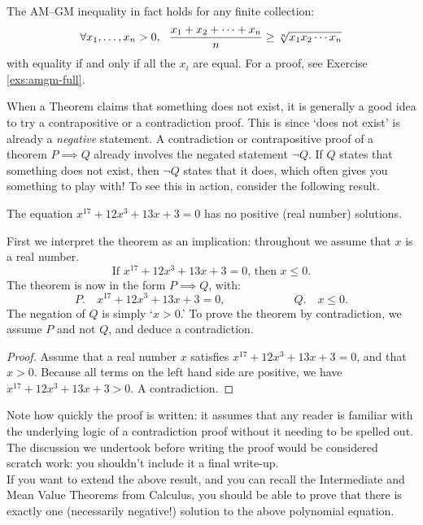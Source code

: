 The AM--GM inequality in fact holds for any finite collection:
\[\forall \lst xn>0,\ \ \frac{x_1+x_2+\cdots+x_n}n\ge\sqrt[n]{x_1x_2\cdots x_n}\]
with equality if and only if all the $x_i$ are equal. For a proof, see Exercise \ref{exs:amgm-full}.




When a Theorem claims that something does not exist, it is generally a good idea to try a contrapositive or a contradiction proof. This is since `does not exist' is already a \emph{negative} statement. A contradiction or contrapositive proof of a theorem $P\implies Q$ already involves the negated statement $\neg Q$. If $Q$ states that something does not exist, then $\neg Q$ states that it does, which often gives you something to play with! To see this in action, consider the following result.

\begin{thm}{}{}
The equation $x^{17}+12x^3+13x+3=0$ has no positive (real number) solutions.
\end{thm}

 First we interpret the theorem as an implication: throughout we assume that $x$ is a real number.
\[\text{If $x^{17}+12x^3+13x+3=0$, then $x\leq 0$.}\]
The theorem is now in the form $P\implies Q$, with:
\[P.\quad x^{17}+12x^3+13x+3=0,\qquad\qquad\qquad Q.\quad x\le 0.\]
The negation of $Q$ is simply `$x>0$.' To prove the theorem by contradiction, we assume $P$ and not $Q$, and deduce a contradiction.

\begin{proof}
Assume that a real number $x$ satisfies $x^{17}+12x^3+13x+3=0$, and that $x>0$. Because all terms on the left hand side are positive, we have $x^{17}+12x^3+13x+3>0$. A contradiction.
\end{proof}


 Note how quickly the proof is written: it assumes that any reader is familiar with the underlying logic of a contradiction proof without it needing to be spelled out. The discussion we undertook before writing the proof would be considered scratch work: you shouldn't include it a final write-up.\\

 If you want to extend the above result, and you can recall the Intermediate and Mean Value Theorems from Calculus, you should be able to prove that there is exactly one (necessarily negative!) solution to the above polynomial equation.


